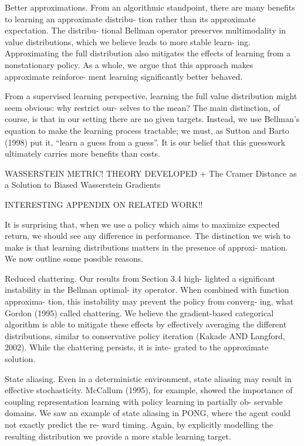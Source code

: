 \documentclass[12pt,a4paper,openright,twoside]{article}
\numberwithin{equation}{section}
\theoremstyle{definition}
\theoremstyle{remark}
\theoremstyle{plain}
\begin{document}
Better approximations. From an algorithmic standpoint, there are many benefits to learning an approximate distribu- tion rather than its approximate expectation. The distribu- tional Bellman operator preserves multimodality in value distributions, which we believe leads to more stable learn- ing. Approximating the full distribution also mitigates the effects of learning from a nonstationary policy. As a whole, we argue that this approach makes approximate reinforce- ment learning significantly better behaved.

From a supervised learning perspective, learning the full value distribution might seem obvious: why restrict our- selves to the mean? The main distinction, of course, is that in our setting there are no given targets. Instead, we use Bellman’s equation to make the learning process tractable; we must, as Sutton and Barto (1998) put it, “learn a guess from a guess”. It is our belief that this guesswork ultimately carries more benefits than costs.

WASSERSTEIN METRIC! THEORY DEVELOPED + The Cramer Distance as a Solution to Biased Wasserstein Gradients

INTERESTING APPENDIX ON RELATED WORK!!

It is surprising that, when we use a policy which aims to maximize expected return, we should see any difference in performance. The distinction we wish to make is that learning distributions matters in the presence of approxi- mation. We now outline some possible reasons.

Reduced chattering. Our results from Section 3.4 high- lighted a significant instability in the Bellman optimal- ity operator. When combined with function approxima- tion, this instability may prevent the policy from converg- ing, what Gordon (1995) called chattering. We believe the gradient-based categorical algorithm is able to mitigate these effects by effectively averaging the different distributions, similar to conservative policy iteration (Kakade AND Langford, 2002). While the chattering persists, it is inte- grated to the approximate solution.

State aliasing. Even in a deterministic environment, state aliasing may result in effective stochasticity. McCallum (1995), for example, showed the importance of coupling representation learning with policy learning in partially ob- servable domains. We saw an example of state aliasing in PONG, where the agent could not exactly predict the re- ward timing. Again, by explicitly modelling the resulting distribution we provide a more stable learning target.
\end{document}
